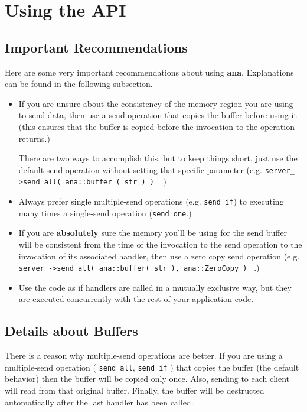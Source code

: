 \documentclass[a4paper,12pt,english]{article}
\newcommand{\ana}{\textbf{ana}}
\begin{document}
\section{Using the API}

\subsection{Important Recommendations}

Here   are   some   very   important   recommendations   about   using
\ana. Explanations can be found in the following subsection.

\begin{itemize}
   \item If you are unsure about the consistency of the memory region
     you are using to send data, then use a send operation that copies
     the buffer before using it (this ensures that the buffer is
     copied before the invocation to the operation returns.)
     
     There are two ways to  accomplish this, but to keep things short,
     just use the default send operation without setting that specific
     parameter (e.g. \texttt{server\_->send\_all(  ana::buffer ( str )
       ) } .)
   \item   Always  prefer   single   multiple-send  operations   (e.g.
     \texttt{send\_if})   to  executing   many  times   a  single-send
     operation (\texttt{send\_one}.)
   \item  If you  are \textbf{absolutely}  sure the  memory  you'll be
     using for the send buffer will be consistent from the time of the
     invocation  to  the  send  operation  to the  invocation  of  its
     associated  handler,   then  use  a  zero   copy  send  operation
     (e.g.    \texttt{server\_->send\_all(    ana::buffer(   str    ),
       ana::ZeroCopy ) } .)
   \item  Use  the  code as  if  handlers  are  called in  a  mutually
     exclusive way,  but they are executed concurrently  with the rest
     of your application code.
\end{itemize}

\subsection{Details about Buffers}
\label{bufcopy}

There is a reason why  multiple-send operations are better. If you are
using     a    multiple-send    operation     (    \texttt{send\_all},
\texttt{send\_if} ) that copies the buffer (the default behavior) then
the buffer will be copied only once. Also, sending to each client will
read from that original buffer. Finally, the buffer will be destructed
automatically after the last handler has been called.
\end{document}
